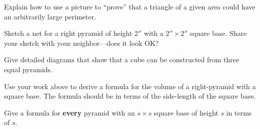 \begin{prob}
Explain how to use a picture to ``prove'' that a triangle of a given
  area could have an arbitrarily large perimeter.
\end{prob}



\begin{prob}
Sketch a net for a right pyramid of height $2''$ with a $2'' \times
2''$ square base. Share your sketch with your neighbor---does it look
OK?
\end{prob}


\begin{prob}
Give detailed diagrams that show that a cube can be constructed from
three equal pyramids.
\end{prob}

\begin{prob}
Use your work above to derive a formula for the volume of a
right-pyramid with a square base. The formula should be in terms of
the side-length of the square base.
\end{prob}

\begin{prob}
Give a formula for \textbf{every} pyramid with an $s\times s$ square base of height $s$ in terms of $s$. 
\end{prob}


